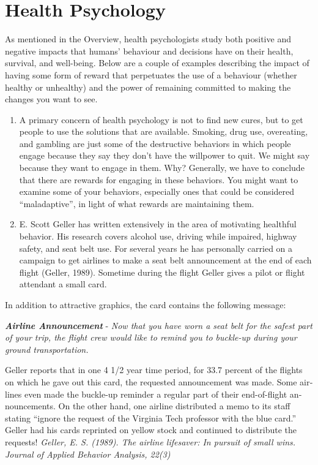 \documentclass[
]{book}
\begin{document}
\hypertarget{health-psychology}{%
\section{Health Psychology}\label{health-psychology}}

As mentioned in the Overview, health psychologists study both positive and negative impacts that humans' behaviour and decisions have on their health, survival, and well-being. Below are a couple of examples describing the impact of having some form of reward that perpetuates the use of a behaviour (whether healthy or unhealthy) and the power of remaining committed to making the changes you want to see.

\begin{enumerate}
\def\labelenumi{\arabic{enumi}.}
\item
  A primary concern of health psychology is not to find new cures, but to get peo­ple to use the solutions that are available. Smoking, drug use, overeating, and gambling are just some of the destructive behaviors in which people engage be­cause they say they don't have the willpower to quit. We might say because they want to engage in them. Why? Generally, we have to conclude that there are rewards for engaging in these behaviors. You might want to examine some of your behaviors, especially ones that could be considered ``maladaptive'', in light of what rewards are maintaining them.
\item
  E. Scott Geller has written extensively in the area of motivating healthful behav­ior. His research covers alcohol use, driving while impaired, highway safety, and seat belt use. For several years he has personally carried on a campaign to get air­lines to make a seat belt announcement at the end of each flight (Geller, 1989). Sometime during the flight Geller gives a pilot or flight attendant a small card.
\end{enumerate}

In addition to attractive graphics, the card contains the following message:

\textbf{\emph{Airline Announcement}} - \emph{Now that you have worn a seat belt for the safest part of your trip, the flight crew would like to remind you to buckle-up during your ground transportation.}

Geller reports that in one 4 1/2 year time period, for 33.7 percent of the flights on which he gave out this card, the requested announcement was made. Some air­lines even made the buckle-up reminder a regular part of their end-of-flight an­nouncements. On the other hand, one airline distributed a memo to its staff stating ``ignore the request of the Virginia Tech professor with the blue card.'' Geller had his cards reprinted on yellow stock and continued to distribute the requests! \emph{Geller, E. S. (1989). The airline lifesaver: In pursuit of small wins. Journal of Applied Behavior Analysis, 22(3)}
\end{document}
